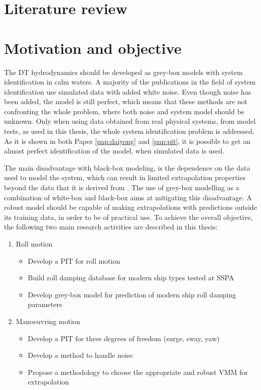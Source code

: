 \section{Literature review}


\section{Motivation and objective}
\label{sec:motivation}
The DT hydrodynamics should be developed as grey-box models with system identification in calm waters. A majority of the publications in the field of system identification use simulated data with added white noise. Even though noise has been added, the model is still perfect, which means that these methods are not confronting the whole problem, where both noise and system model should be unknown. 
Only when using data obtained from real physical systems, from model tests, as used in this thesis, the whole system identification problem is addressed.
As it is shown in both Paper \ref{pap:daiyong} and \ref{pap:pit}, it is possible to get an almost perfect identification of the model, when simulated data is used.

The main disadvantage with black-box modeling, is the dependence on the data used to model the system, which can result in limited extrapolation properties beyond the data that it is derived from \cite{leifsson_grey-box_2008}. The use of grey-box modelling as a combination of white-box and black-box aims at mitigating this disadvantage. A robust model should be capable of making extrapolations with predictions outside its training data, in order to be of practical use.
\bigbreak
\noindent To achieve the overall objective, the following two main research activities are described in this thesis:
\begin{enumerate}

    \item Roll motion
    \begin{itemize}
        \item Develop a PIT for roll motion
        \item Build roll damping database for modern ship types tested at SSPA
        \item Develop grey-box model for prediction of modern ship roll damping parameters
    \end{itemize}
    
    \item Manoeuvring motion
    \begin{itemize}
        \item Develop a PIT for three degrees of freedom (surge, sway, yaw)
        \item Develop a method to handle noise
        \item Propose a methodology to choose the appropriate and robust VMM for extrapolation
 
    \end{itemize}
\end{enumerate}

